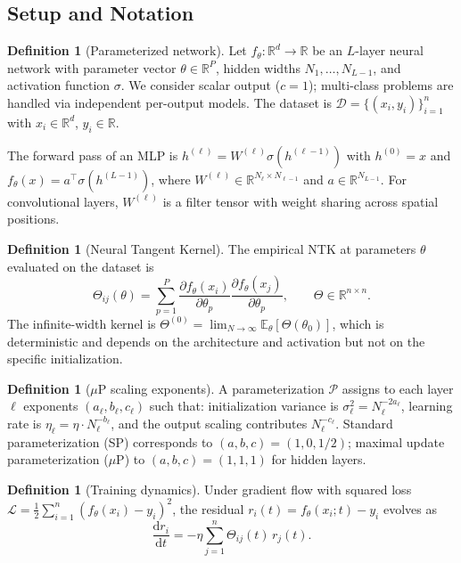 \documentclass[11pt]{article}
\theoremstyle{definition}
\newtheorem{definition}[theorem]{Definition}
\newcommand{\R}{\mathbb{R}}
\newcommand{\E}{\mathbb{E}}
\newcommand{\cD}{\mathcal{D}}
\newcommand{\cL}{\mathcal{L}}
\newcommand{\cP}{\mathcal{P}}
\newcommand{\muP}{\mu\text{P}}
\newcommand{\dd}{\mathrm{d}}
\newcommand{\pp}{\partial}
\renewcommand{\Theta}{\varTheta}
\begin{document}
\subsection{Setup and Notation}
\label{sec:setup}

\begin{definition}[Parameterized network]
\label{def:network}
Let $f_\theta : \R^d \to \R$ be an $L$-layer neural network with parameter vector $\theta \in \R^P$, hidden widths $N_1, \ldots, N_{L-1}$, and activation function $\sigma$. We consider scalar output ($c = 1$); multi-class problems are handled via independent per-output models. The dataset is $\cD = \{(x_i, y_i)\}_{i=1}^n$ with $x_i \in \R^d$, $y_i \in \R$.
\end{definition}

The forward pass of an MLP is $h^{(\ell)} = W^{(\ell)} \sigma(h^{(\ell-1)})$ with $h^{(0)} = x$ and $f_\theta(x) = a^\top \sigma(h^{(L-1)})$, where $W^{(\ell)} \in \R^{N_\ell \times N_{\ell-1}}$ and $a \in \R^{N_{L-1}}$. For convolutional layers, $W^{(\ell)}$ is a filter tensor with weight sharing across spatial positions.

\begin{definition}[Neural Tangent Kernel]
\label{def:ntk}
The empirical NTK at parameters $\theta$ evaluated on the dataset is
\begin{equation}
\Theta_{ij}(\theta) = \sum_{p=1}^P \frac{\pp f_\theta(x_i)}{\pp \theta_p} \frac{\pp f_\theta(x_j)}{\pp \theta_p}, \qquad \Theta \in \R^{n \times n}.
\end{equation}
The infinite-width kernel is $\Theta^{(0)} = \lim_{N \to \infty} \E_\theta[\Theta(\theta_0)]$, which is deterministic and depends on the architecture and activation but not on the specific initialization.
\end{definition}

\begin{definition}[$\muP$ scaling exponents]
\label{def:muP}
A parameterization $\cP$ assigns to each layer $\ell$ exponents $(a_\ell, b_\ell, c_\ell)$ such that: initialization variance is $\sigma_\ell^2 = N_\ell^{-2a_\ell}$, learning rate is $\eta_\ell = \eta \cdot N_\ell^{-b_\ell}$, and the output scaling contributes $N_\ell^{-c_\ell}$. Standard parameterization (SP) corresponds to $(a,b,c) = (1, 0, 1/2)$; maximal update parameterization ($\muP$) to $(a,b,c) = (1, 1, 1)$ for hidden layers.
\end{definition}

\begin{definition}[Training dynamics]
\label{def:training}
Under gradient flow with squared loss $\cL = \frac{1}{2}\sum_{i=1}^n (f_\theta(x_i) - y_i)^2$, the residual $r_i(t) = f_\theta(x_i; t) - y_i$ evolves as
\begin{equation}
\label{eq:residual-ode}
\frac{\dd r_i}{\dd t} = -\eta \sum_{j=1}^n \Theta_{ij}(t)\, r_j(t).
\end{equation}
\end{definition}
\end{document}

